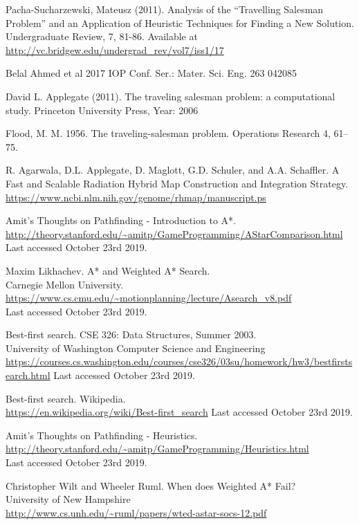 \documentclass[runningheads]{llncs}
\begin{document}
\begin{thebibliography}{8}

Pacha-Sucharzewski, Mateusz (2011). Analysis of the “Travelling Salesman Problem” and an Application of Heuristic Techniques for Finding a New Solution. Undergraduate Review, 7, 81-86.
Available at \url{http://vc.bridgew.edu/undergrad_rev/vol7/iss1/17}

Belal Ahmed et al 2017 IOP Conf. Ser.: Mater. Sci. Eng. 263 042085

David L. Applegate (2011). The traveling salesman problem: a computational study.
Princeton University Press, Year: 2006

Flood, M. M. 1956. The traveling-salesman problem. Operations Research 4, 61–75.

R. Agarwala, D.L. Applegate, D. Maglott, G.D. Schuler, and A.A. Schaffler. A Fast and Scalable Radiation Hybrid Map Construction and Integration Strategy.
\url{https://www.ncbi.nlm.nih.gov/genome/rhmap/manuscript.ps}

Amit’s Thoughts on Pathfinding - Introduction to A*.\\
\url{http://theory.stanford.edu/~amitp/GameProgramming/AStarComparison.html}\\
Last accessed October 23rd 2019.

Maxim Likhachev. A* and Weighted A* Search.\\
Carnegie Mellon University.\\
\url{https://www.cs.cmu.edu/~motionplanning/lecture/Asearch_v8.pdf}\\
Last accessed October 23rd 2019.

Best-first search. CSE 326: Data Structures, Summer 2003.\\
University of Washington Computer Science and Engineering\\
\url{https://courses.cs.washington.edu/courses/cse326/03su/homework/hw3/bestfirstsearch.html}
Last accessed October 23rd 2019.

Best-first search. Wikipedia.\\
\url{https://en.wikipedia.org/wiki/Best-first_search}
Last accessed October 23rd 2019.

Amit’s Thoughts on Pathfinding - Heuristics.\\
\url{http://theory.stanford.edu/~amitp/GameProgramming/Heuristics.html}\\
Last accessed October 23rd 2019.

Christopher Wilt and Wheeler Ruml. When does Weighted A* Fail?\\
University of New Hampshire\\
\url{http://www.cs.unh.edu/~ruml/papers/wted-astar-socs-12.pdf}



\end{thebibliography}
\end{document}
